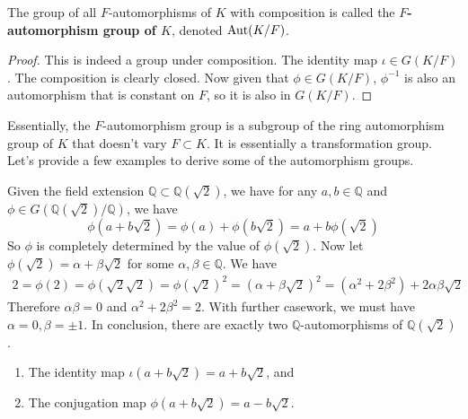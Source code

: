   \begin{definition}
    The group of all $F$-automorphisms of $K$ with composition is called the \textbf{$F$-automorphism group of $K$}, denoted $\operatorname{Aut}(K/F)$. 
  \end{definition}
  \begin{proof}
    This is indeed a group under composition. The identity map $\iota \in G(K/F)$. The composition is clearly closed. Now given that $\phi \in G(K/F)$, $\phi^{-1}$ is also an automorphism that is constant on $F$, so it is also in $G(K/F)$. 
  \end{proof} 

  Essentially, the $F$-automorphism group is a subgroup of the ring automorphism group of $K$ that doesn't vary $F \subset K$. It is essentially a transformation group. Let's provide a few examples to derive some of the automorphism groups. 

  \begin{example}
    Given the field extension $\mathbb{Q} \subset \mathbb{Q}(\sqrt{2})$, we have for any $a, b \in \mathbb{Q}$ and $\phi \in G(\mathbb{Q}(\sqrt{2})/\mathbb{Q})$, we have 
    \begin{equation}
      \phi(a + b \sqrt{2}) = \phi(a) + \phi(b \sqrt{2}) = a + b \phi(\sqrt{2}) 
    \end{equation}
    So $\phi$ is completely determined by the value of $\phi(\sqrt{2})$. Now let $\phi(\sqrt{2}) = \alpha + \beta \sqrt{2}$ for some $\alpha, \beta \in \mathbb{Q}$. We have 
    \begin{align}
      2 = \phi(2) = \phi(\sqrt{2} \sqrt{2}) = \phi(\sqrt{2})^2 = (\alpha + \beta\sqrt{2})^2 = (\alpha^2 + 2 \beta^2) + 2 \alpha \beta \sqrt{2} 
    \end{align}
    Therefore $\alpha \beta = 0$ and $\alpha^2 + 2 \beta^2 = 2$. With further casework, we must have $\alpha = 0, \beta = \pm 1$. In conclusion, there are exactly two $\mathbb{Q}$-automorphisms of $\mathbb{Q}(\sqrt{2})$. 
    \begin{enumerate}
      \item The identity map $\iota(a + b \sqrt{2}) = a + b \sqrt{2}$, and 
      \item The conjugation map $\phi(a + b \sqrt{2}) = a - b \sqrt{2}$. 
    \end{enumerate}
  \end{example}

